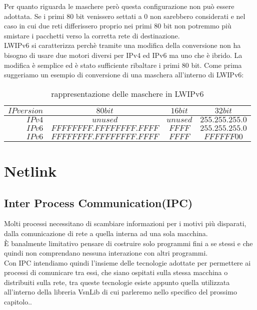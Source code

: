 Per quanto riguarda le maschere per\`o questa configurazione non pu\`o essere adottata. Se i primi 80 bit venissero settati a 0 non sarebbero considerati e nel caso in cui due reti differissero proprio nei primi 80 bit non potremmo pi\`u smistare i pacchetti verso la corretta rete di destinazione.\\
LWIPv6 si caratterizza perch\`e tramite una modifica della conversione non ha bisogno di usare due motori diversi per IPv4 ed IPv6 ma uno che \`e ibrido. La modifica \`e semplice ed \`e stato sufficiente ribaltare i primi 80 bit. Come prima suggeriamo un esempio di conversione di una maschera all'interno di LWIPv6:

\begin{table}[h]                        %
\begin{center}                          %
\begin{tabular}{r|c|c|c}                  %
\hline
$IP version$ & $80 bit$ & $16 bit$ & $32 bit$\\
\hline  \hline        %
$IPv4$ & $unused$  &  $unused$  & $255.255.255.0$\\           %
\hline                                  %
$IPv6$ & $FFFFFFFF.FFFFFFFF.FFFF$ & $FFFF$ & $255.255.255.0$\\           %
\hline                                  %
$IPv6$ & $FFFFFFFF.FFFFFFFF.FFFF$ & $FFFF$ & $FFFFFF00$\\
\hline                           %
\end{tabular}
\caption[IPv4 to IPv6 mask conversion]{rappresentazione delle maschere in LWIPv6}\label{tab:IPv4toIPv6 mask}
\end{center}
\end{table}
\section{Netlink}
\subsection{Inter Process Communication(IPC)}
Molti processi necessitano di scambiare informazioni per i motivi pi\`u disparati, dalla comunicazione di rete a quella interna ad una sola macchina.\\
\`E banalmente limitativo pensare di costruire solo programmi fini a se stessi e che quindi non comprendano nessuna interazione con altri programmi.\\
Con IPC intendiamo quindi l'insieme delle tecnologie adottate per permettere ai processi di comunicare tra essi, che siano ospitati sulla stessa macchina o distribuiti sulla rete, tra queste tecnologie esiste appunto quella utilizzata all'interno della libreria VsnLib di cui parleremo nello specifico del prossimo capitolo..
